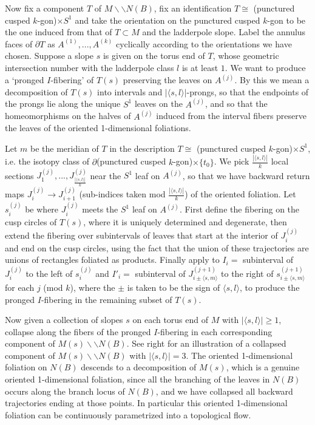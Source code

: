 \documentclass[12pt]{amsart}
\theoremstyle{definition}
\numberwithin{equation}{section}
\begin{document}
Now fix a component $T$ of $M \backslash \backslash N(B)$, fix an identification $T \cong$ (punctured cusped $k$-gon)$\times S^1$ and take the orientation on the punctured cusped $k$-gon to be the one induced from that of $T \subset M$ and the ladderpole slope. Label the annulus faces of $\partial T$ as $A^{(1)},...,A^{(k)}$ cyclically according to the orientations we have chosen. Suppose a slope $s$ is given on the torus end of $T$, whose geometric intersection number with the ladderpole class $l$ is at least $1$. We want to produce a `pronged $I$-fibering' of $T(s)$ preserving the leaves on $A^{(j)}$. By this we mean a decomposition of $T(s)$ into intervals and $|\langle s,l \rangle|$-prongs, so that the endpoints of the prongs lie along the unique $S^1$ leaves on the $A^{(j)}$, and so that the homeomorphisms on the halves of $A^{(j)}$ induced from the interval fibers preserve the leaves of the oriented 1-dimensional foliations.

Let $m$ be the meridian of $T$ in the description $T \cong$ (punctured cusped $k$-gon)$\times S^1$, i.e. the isotopy class of $\partial$(punctured cusped $k$-gon)$\times \{t_0\}$. We pick $\frac{|\langle s,l \rangle|}{k}$ local sections $J^{(j)}_1,...,J^{(j)}_{\frac{|\langle s,l \rangle|}{k}}$ near the $S^1$ leaf on $A^{(j)}$, so that we have backward return maps $J^{(j)}_i \to J^{(j)}_{i+1}$ (sub-indices taken mod $\frac{|\langle s,l \rangle|}{k}$) of the oriented foliation. Let $s^{(j)}_i$ be where $J^{(j)}_i$ meets the $S^1$ leaf on $A^{(j)}$. First define the fibering on the cusp circles of $T(s)$, where it is uniquely determined and degenerate, then extend the fibering over subintervals of leaves that start at the interior of $J^{(j)}_i$ and end on the cusp circles, using the fact that the union of these trajectories are unions of rectangles foliated as products. Finally apply  to $I_i=$ subinterval of $J^{(j)}_i$ to the left of $s^{(j)}_i$ and $I'_i=$ subinterval of $J^{(j+1)}_{i\pm \langle s,m \rangle}$ to the right of $s^{(j+1)}_{i\pm \langle s,m \rangle}$ for each $j$ (mod $k$), where the $\pm$ is taken to be the sign of $\langle s,l \rangle$, to produce the pronged $I$-fibering in the remaining subset of $T(s)$. 

Now given a collection of slopes $s$ on each torus end of $M$ with $|\langle s,l \rangle| \geq 1$, collapse along the fibers of the pronged $I$-fibering in each corresponding component of $M(s) \backslash \backslash N(B)$. See  right for an illustration of a collapsed component of $M(s) \backslash \backslash N(B)$ with $|\langle s,l \rangle|=3$. The oriented 1-dimensional foliation on $N(B)$ descends to a decomposition of $M(s)$, which is a genuine oriented 1-dimensional foliation, since all the branching of the leaves in $N(B)$ occurs along the branch locus of $N(B)$, and we have collapsed all backward trajectories ending at those points. In particular this oriented 1-dimensional foliation can be continuously parametrized into a topological flow. 
\end{document}
